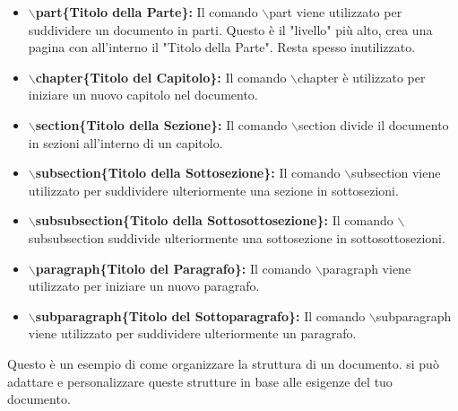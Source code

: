 \documentclass[12pt, oneside, openany, a4paper]{book}
\begin{document}
	\begin{itemize}
		
		\item \textbf{$\backslash$part\{Titolo della Parte\}:} Il comando $\backslash$part viene utilizzato per suddividere un documento in parti. Questo è il "livello" più alto, crea una pagina con all'interno il "Titolo della Parte". Resta spesso inutilizzato.
		
		\item \textbf{$\backslash$chapter\{Titolo del Capitolo\}:} Il comando $\backslash$chapter è utilizzato per iniziare un nuovo capitolo nel documento.
		
		\item \textbf{$\backslash$section\{Titolo della Sezione\}:} Il comando $\backslash$section divide il documento in sezioni all'interno di un capitolo.
		
		\item \textbf{$\backslash$subsection\{Titolo della Sottosezione\}:} Il comando $\backslash$subsection viene utilizzato per suddividere ulteriormente una sezione in sottosezioni.
		
		\item \textbf{$\backslash$subsubsection\{Titolo della Sottosottosezione\}:} Il comando $\backslash$subsubsection suddivide ulteriormente una sottosezione in sottosottosezioni.
		
		\item \textbf{$\backslash$paragraph\{Titolo del Paragrafo\}:} Il comando $\backslash$paragraph viene utilizzato per iniziare un nuovo paragrafo.
		
		\item \textbf{$\backslash$subparagraph\{Titolo del Sottoparagrafo\}:} Il comando $\backslash$subparagraph viene utilizzato per suddividere ulteriormente un paragrafo.
		
	\end{itemize}
	Questo è un esempio di come organizzare la struttura di un documento. si può adattare e personalizzare queste strutture in base alle esigenze del tuo documento.
\end{document}

